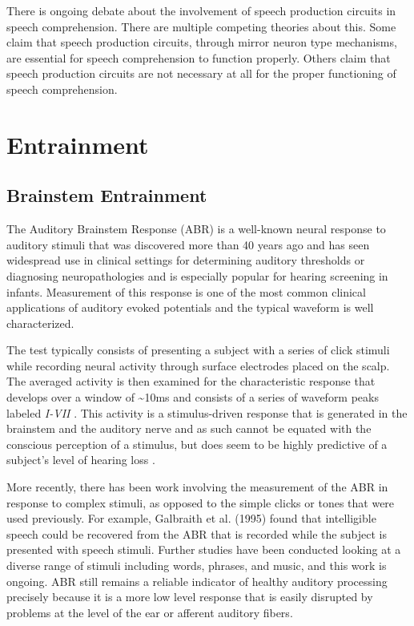 \documentclass[titlepage]{article}
\begin{document}
    There is ongoing debate about the involvement of speech production
    circuits in speech comprehension. There are multiple competing theories
    about this. Some claim that speech production circuits, through
    mirror neuron type mechanisms, are essential for speech comprehension
    to function properly. Others claim that speech production circuits are not
    necessary at all for the proper functioning of speech comprehension.

\section{Entrainment} \label{entrainment}

  \subsection{Brainstem Entrainment} \label{brainstemEntrainment}

    The Auditory Brainstem Response (ABR) is a well-known neural response to
    auditory stimuli that was discovered more than 40 years ago
    \cite{Jewett1971,Jewett1970} and has seen widespread use in clinical
    settings for determining auditory thresholds or diagnosing neuropathologies
    \cite{Skoe2010} and is especially popular for hearing screening in infants.
    Measurement of this response is one of the most common clinical applications
    of auditory evoked potentials and the typical waveform is well
    characterized.

    The test typically consists of presenting a subject with a series of click
    stimuli while recording neural activity through surface electrodes placed on
    the scalp. The averaged activity is then examined for the characteristic
    response that develops over a window of \textasciitilde 10ms and consists
    of a series of waveform peaks labeled \textit{I-VII}
    \cite{Sininger1993,Bhattacharyya2017}. This activity is a stimulus-driven
    response that is generated in the brainstem and the auditory nerve and as
    such cannot be equated with the conscious perception of a stimulus, but
    does seem to be highly predictive of a subject's level of hearing loss
    \cite{Sininger1993}.

    More recently, there has been work involving the measurement of the ABR in
    response to complex stimuli, as opposed to the simple clicks or tones that
    were used previously. For example, Galbraith et al. (1995)
    \cite{Galbraith1995} found that intelligible speech could be recovered from
    the ABR that is recorded while the subject is presented with speech stimuli.
    Further studies have been conducted looking at a diverse range of stimuli
    including words, phrases, and music, and this work is ongoing. ABR still 
    remains a reliable indicator of healthy auditory processing precisely 
    because it is a more low level response that is easily disrupted by problems
    at the level of the ear or afferent auditory fibers.
\end{document}
